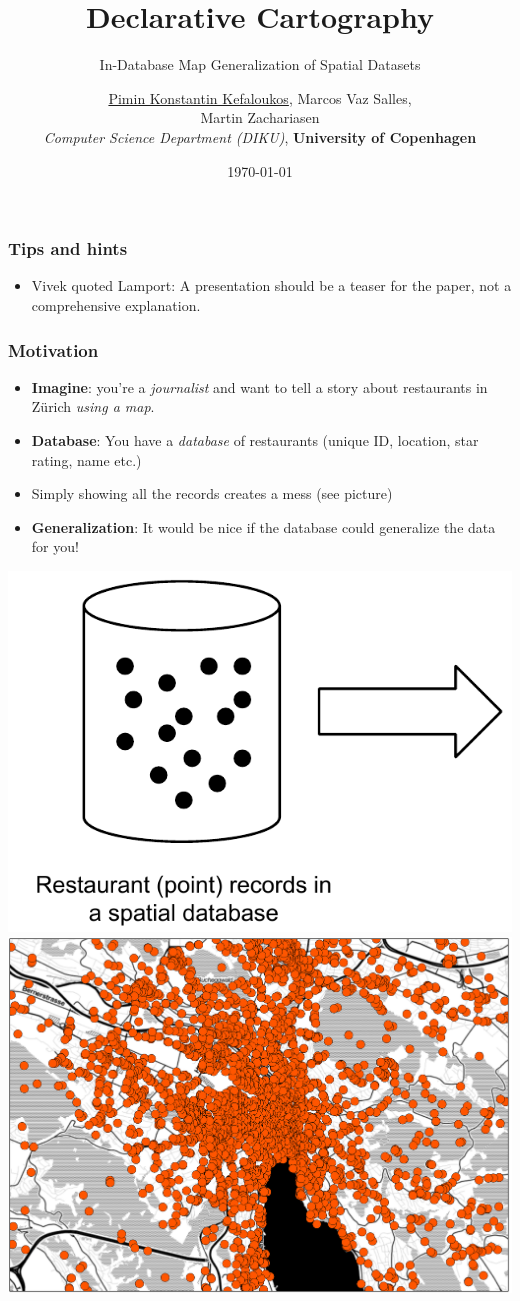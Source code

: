 \documentclass{beamer}
\title{Declarative Cartography}
\subtitle{In-Database Map Generalization of Spatial Datasets}
\author{\underline{Pimin Konstantin Kefaloukos}, Marcos Vaz Salles, \\Martin Zachariasen\\ \small{\emph{Computer Science Department (DIKU)}, \textbf{University of Copenhagen}}}
\date{\today}
\begin{document}
\frame{\titlepage}

\frame
{
	\frametitle{Tips and hints}
	\begin{itemize}
	\item Vivek quoted Lamport: A presentation should be a teaser for the paper, not a comprehensive explanation.
	\end{itemize}
}

\frame
{
  \frametitle{Motivation}
  \begin{itemize}
  \item \textbf{Imagine}: you're a \emph{journalist} and want to tell a story about restaurants in Z\"{u}rich \emph{using a map}.
  \item \textbf{Database}: You have a \emph{database} of restaurants (unique ID, location, star rating, name etc.)
  \item Simply showing all the records creates a mess (see picture)
  \item \textbf{Generalization}: It would be nice if the database could generalize the data for you!
  \end{itemize}
  \includegraphics[scale=0.5]{figs/spatial-database-with-points.pdf} \includegraphics[scale=0.18]{figs/zurich-unfiltered.pdf}
}
\end{document}
